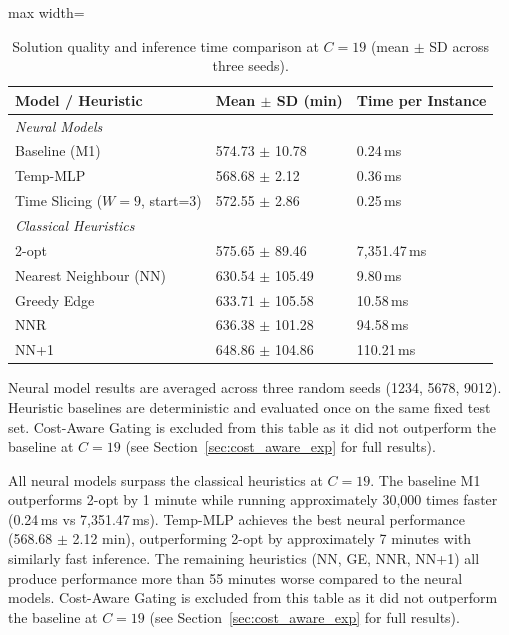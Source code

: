 \begin{table}[H]
\centering
\caption{Solution quality and inference time comparison at $C = 19$ (mean $\pm$ SD across three seeds).}
\label{tab:heuristic_c19}
\begin{adjustbox}{max width=\textwidth}
\begin{tabular}{lll}
\toprule
\textbf{Model / Heuristic} & \textbf{Mean $\pm$ SD (min)} & \textbf{Time per Instance} \\
\midrule
\multicolumn{3}{l}{\textit{Neural Models}} \\
Baseline (M1)                 & 574.73 $\pm$ 10.78 & 0.24\,ms \\
Temp-MLP                      & 568.68 $\pm$ 2.12  & 0.36\,ms \\
Time Slicing ($W=9$, start=3) & 572.55 $\pm$ 2.86  & 0.25\,ms \\
\midrule
\multicolumn{3}{l}{\textit{Classical Heuristics}} \\
2-opt                  & 575.65 $\pm$ 89.46  & 7{,}351.47\,ms \\
Nearest Neighbour (NN) & 630.54 $\pm$ 105.49 & 9.80\,ms \\
Greedy Edge            & 633.71 $\pm$ 105.58 & 10.58\,ms \\
NNR                    & 636.38 $\pm$ 101.28 & 94.58\,ms \\
NN+1                   & 648.86 $\pm$ 104.86 & 110.21\,ms \\
\bottomrule
\end{tabular}
\end{adjustbox}
\smallskip
\begin{minipage}{\linewidth}
\small Neural model results are averaged across three random seeds (1234, 5678, 9012). Heuristic baselines are deterministic and evaluated once on the same fixed test set. Cost-Aware Gating is excluded from this table as it did not outperform the baseline at $C = 19$ (see Section~\ref{sec:cost_aware_exp} for full results).
\end{minipage}
\end{table}


\medskip

All neural models surpass the classical heuristics at $C = 19$. The baseline M1 outperforms
2-opt by 1 minute while running approximately 30,000 times faster (0.24\,ms vs 7,351.47\,ms).
Temp-MLP achieves the best neural performance (568.68 $\pm$ 2.12 min), outperforming 2-opt by
approximately 7 minutes with similarly fast inference. The remaining heuristics (NN, GE, NNR,
NN+1) all produce performance more than 55 minutes worse compared to the neural models.
Cost-Aware Gating is excluded from this table as it did not outperform the baseline at $C = 19$
(see Section~\ref{sec:cost_aware_exp} for full results).

